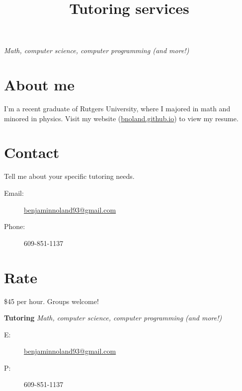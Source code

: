 \documentclass{article}
\title{\fontsize{50}{0}\selectfont \vspace{-2ex}\textbf{Tutoring services}\vspace{-1.5ex}}
\author{}
\date{}
\begin{document}
\maketitle

\Huge

\begin{center}
{\Huge \emph{Math, computer science, computer programming (and more!)}}
\end{center}

\section*{About me}

I'm a recent graduate of Rutgers University, where I majored in math and minored in physics. Visit my website (\url{bnoland.github.io}) to view my resume.

\section*{Contact}

Tell me about your specific tutoring needs.
\medskip
\begin{description}
\item[Email:] \url{benjaminnoland93@gmail.com}
\item[Phone:] 609-851-1137
\end{description}

\section*{Rate}

\$45 per hour. Groups welcome!

\stubs[10]{5.2cm}
{
\small
\textbf{Tutoring} \emph{Math, computer science, computer programming (and more!)}
\begin{description}
\item[E:] \url{benjaminnoland93@gmail.com}
\item[P:] 609-851-1137
\end{description}
}
\end{document}
